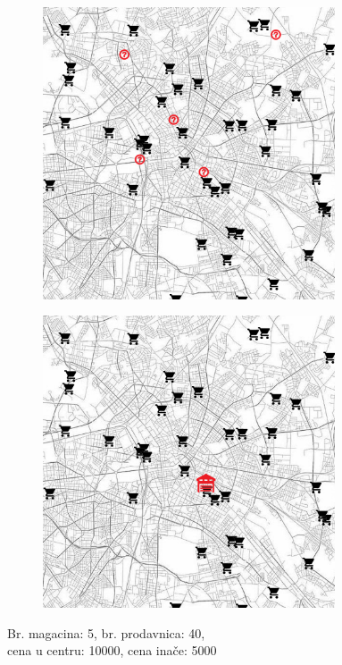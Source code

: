 \documentclass[a4paper]{article}
\begin{document}
\begin{figure}[H]
\centering
\begin{subfigure}{.5\textwidth}
    \centering
    \includegraphics[width=0.95\textwidth]{pics/candidates2.png}
\end{subfigure}%
\begin{subfigure}{.5\textwidth}
    \centering
    \includegraphics[width=0.95\textwidth]{pics/final2.png}
\end{subfigure}
\caption[long]{Br. magacina: 5, br. prodavnica: 40, \\cena u centru: 10000, cena inače: 5000}
\label{fig:sl2}
\end{figure}
\end{document}
